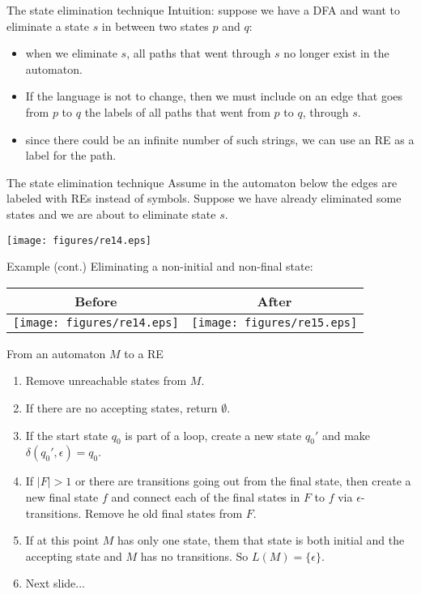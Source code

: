 \documentclass{prosper}%
\begin{document}
\begin{slide}{The state elimination technique}
Intuition: suppose we have a DFA and want to eliminate a state $s$ in between two states $p$ and $q$:
\begin{itemize}
\item when we eliminate $s$, all paths that went through $s$ no longer exist in the automaton.
\item If the language is not to change, then we must include on an edge that goes from $p$ to $q$ the labels of all paths that went from $p$ to $q$, through $s$.
\item since there could be an infinite number of such strings, we can use an RE as a label for the path.
\end{itemize}
\end{slide}

\begin{slide}{The state elimination technique}
Assume in the automaton below the edges are labeled with REs instead of symbols. Suppose we have already eliminated some states and we are about to eliminate state $s$.
\begin{center}
\texttt{[image: figures/re14.eps]}
\end{center}
\end{slide}

\begin{slide}{Example (cont.)}
Eliminating a non-initial and non-final state:
\begin{center}
\begin{tabular}{c|c}
Before & After\\\hline
\texttt{[image: figures/re14.eps]} &
\texttt{[image: figures/re15.eps]}
\end{tabular}
\end{center}
\end{slide}

\begin{slide}{From an automaton $M$ to a RE}
\begin{enumerate}
\item Remove unreachable states from $M$.
\item If there are no accepting states, return $\emptyset$.
\item If the start state $q_0$ is part of a loop, create a new state $q_0'$ and make $\delta(q_0',\epsilon)=q_0$.
\item If $|F|>1$ or there are transitions going out from the final state, then create a new final state $f$ and connect each of the final states in $F$ to $f$ via $\epsilon$-transitions. Remove he old final states from $F$. 
\item If at this point $M$ has only one state, them that state is both initial and the accepting state and $M$ has no transitions. So $L(M)=\{\epsilon\}$.
\item Next slide...
\end{enumerate}
\end{slide}
\end{document}
